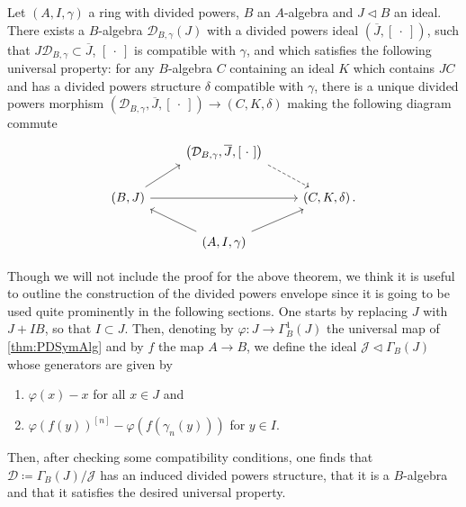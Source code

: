 \begin{thm}\label{thm:PDEnvelope}
	Let $\left(A, I, \gamma\right)$ a ring with divided powers, $B$ an $A$-algebra
	and $J \triangleleft B$ an ideal.
	There exists a $B$-algebra $\mathcal{D}_{B,\gamma}(J)$
	with a divided powers ideal $\left(\overline{J}, [\ \cdot \ ]\right)$,
	such that $J \mathcal{D}_{B, \gamma} \subset \overline{J}$,
	$[\ \cdot \ ]$ is compatible with $\gamma$, and which satisfies the
	following universal property:
	for any $B$-algebra $C$ containing an ideal
	$K$ which contains $JC$ and has a divided powers structure
	$\delta$ compatible  with $\gamma$, there is a unique 
	divided powers morphism 
	$\left(\mathcal{D}_{B,\gamma}, \overline{J}, [\ \cdot \ ]\right) \to 
	\left(C, K, \delta\right)$ making the following
	diagram commute
	\begin{equation*}
	\begin{tikzcd}
		&
		\left(\mathcal{D}_{B, \gamma}, \overline{J}, [\ \cdot \ ]\right)
		\arrow[rd, "", dashrightarrow,
		start anchor=south east] & \\
		\left(B, J\right) \arrow[ru, "", rightarrow,
		end anchor=south west] 
		\arrow[rr, "", rightarrow] & &
		\left(C, K, \delta\right). \\
		&
		\left(A, I, \gamma\right)
		\arrow[lu, "", rightarrow,
		start anchor=north west] 
		\arrow[ru, "", rightarrow,
		start anchor=north east] & 
	\end{tikzcd}
	\end{equation*}
\end{thm}


\begin{rem}[]\label{rem:PDEnvelope}
	Though we will not include the proof for the above theorem,
	we think it is useful to outline the construction of the divided powers envelope
	since it is going to be used quite prominently in the following sections.
	One starts by replacing $J$ with $J + IB$, so that $I \subset J$.
	Then, denoting by $\varphi\colon J \to \Gamma^1_B(J)$ the universal
	map of \cref{thm:PDSymAlg} and by $f$ the map $A \to B$, 
	we define the ideal $\mathcal{J} \triangleleft \Gamma_B(J)$
	whose generators are given by
\begin{enumerate}
	\item $\varphi(x) - x$ for all $x \in J$ and
	\item $\varphi(f(y))^{[n]} - \varphi(f(\gamma_n(y)))$ for $y \in I$.
\end{enumerate}
	Then, after checking some compatibility conditions, one finds that
	$\mathcal{D} \coloneqq \Gamma_B(J)/\mathcal{J}$ has an induced divided powers
	structure, that it is a $B$-algebra and that it satisfies the desired universal property.
\end{rem}



